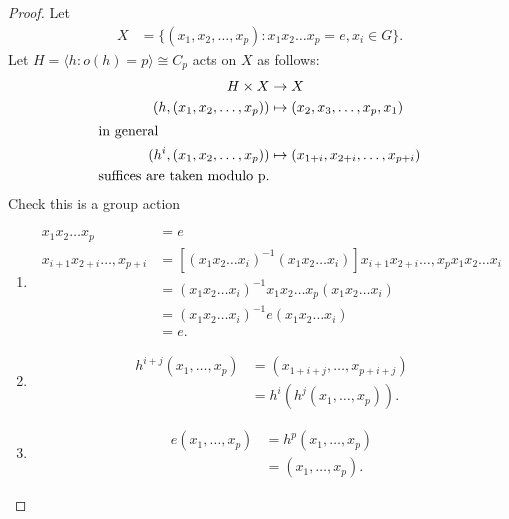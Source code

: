 \begin{proof}
    Let
    \begin{align*}
        X &= \{ (x_1, x_2, \dots, x_p) : x_1 x_2 \dots x_p = e, x_i \in G \}.
    \end{align*} 
    Let $H = \langle h : o(h) = p \rangle \cong C_p$ acts on $X$ as follows:
    \begin{align*}
        H \times X &\to X \\
        (h, (x_1, x_2, \dots, x_p)) &\mapsto (x_2, x_3, \dots, x_p, x_1) \\
        \intertext{in general}
        (h^i, (x_1, x_2, \dots, x_p)) &\mapsto (x_{1 + i}, x_{2 + i}, \dots, x_{p + i}) \\
        \text{suffices are taken modulo p.}
    \end{align*}
    Check this is a group action
    \begin{enumerate} \addtocounter{enumi}{-1}
        \item \begin{align*}
            x_1 x_2 \dots x_p &= e \\
            x_{i + 1} x_{2 + i} \dots, x_{p + i} &= [(x_1 x_2 \dots x_i)^{-1} (x_1 x_2 \dots x_i)] x_{i + 1} x_{2 + i} \dots, x_{p} x_1 x_2 \dots x_i \\ 
            &= (x_1 x_2 \dots x_i)^{-1} x_1 x_2 \dots x_p (x_1 x_2 \dots x_i) \\
            &= (x_1 x_2 \dots x_i)^{-1} e (x_1 x_2 \dots x_i) \\
            &= e.
        \end{align*} 
        \item \begin{align*}
            h^{i + j} (x_1, \dots, x_p) &= (x_{1 + i + j}, \dots, x_{p + i + j}) \\
            &= h^i (h^j (x_1, \dots, x_p)).
        \end{align*} 
        \item \begin{align*}
            e (x_1, \dots, x_p) &= h^p (x_1, \dots, x_p) \\
            &= (x_1, \dots, x_p).
        \end{align*} 
    \end{enumerate} 


\end{proof}
